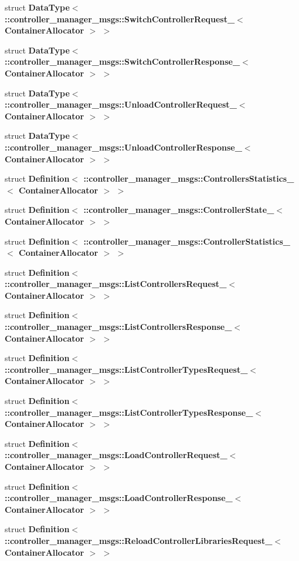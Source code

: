\begin{DoxyCompactItemize}
\item 
struct {\bf \-Data\-Type$<$ \-::controller\-\_\-manager\-\_\-msgs\-::\-Switch\-Controller\-Request\-\_\-$<$ Container\-Allocator $>$ $>$}
\item 
struct {\bf \-Data\-Type$<$ \-::controller\-\_\-manager\-\_\-msgs\-::\-Switch\-Controller\-Response\-\_\-$<$ Container\-Allocator $>$ $>$}
\item 
struct {\bf \-Data\-Type$<$ \-::controller\-\_\-manager\-\_\-msgs\-::\-Unload\-Controller\-Request\-\_\-$<$ Container\-Allocator $>$ $>$}
\item 
struct {\bf \-Data\-Type$<$ \-::controller\-\_\-manager\-\_\-msgs\-::\-Unload\-Controller\-Response\-\_\-$<$ Container\-Allocator $>$ $>$}
\item 
struct {\bf \-Definition$<$ \-::controller\-\_\-manager\-\_\-msgs\-::\-Controllers\-Statistics\-\_\-$<$ Container\-Allocator $>$ $>$}
\item 
struct {\bf \-Definition$<$ \-::controller\-\_\-manager\-\_\-msgs\-::\-Controller\-State\-\_\-$<$ Container\-Allocator $>$ $>$}
\item 
struct {\bf \-Definition$<$ \-::controller\-\_\-manager\-\_\-msgs\-::\-Controller\-Statistics\-\_\-$<$ Container\-Allocator $>$ $>$}
\item 
struct {\bf \-Definition$<$ \-::controller\-\_\-manager\-\_\-msgs\-::\-List\-Controllers\-Request\-\_\-$<$ Container\-Allocator $>$ $>$}
\item 
struct {\bf \-Definition$<$ \-::controller\-\_\-manager\-\_\-msgs\-::\-List\-Controllers\-Response\-\_\-$<$ Container\-Allocator $>$ $>$}
\item 
struct {\bf \-Definition$<$ \-::controller\-\_\-manager\-\_\-msgs\-::\-List\-Controller\-Types\-Request\-\_\-$<$ Container\-Allocator $>$ $>$}
\item 
struct {\bf \-Definition$<$ \-::controller\-\_\-manager\-\_\-msgs\-::\-List\-Controller\-Types\-Response\-\_\-$<$ Container\-Allocator $>$ $>$}
\item 
struct {\bf \-Definition$<$ \-::controller\-\_\-manager\-\_\-msgs\-::\-Load\-Controller\-Request\-\_\-$<$ Container\-Allocator $>$ $>$}
\item 
struct {\bf \-Definition$<$ \-::controller\-\_\-manager\-\_\-msgs\-::\-Load\-Controller\-Response\-\_\-$<$ Container\-Allocator $>$ $>$}
\item 
struct {\bf \-Definition$<$ \-::controller\-\_\-manager\-\_\-msgs\-::\-Reload\-Controller\-Libraries\-Request\-\_\-$<$ Container\-Allocator $>$ $>$}
\item 

\end{DoxyCompactItemize}
